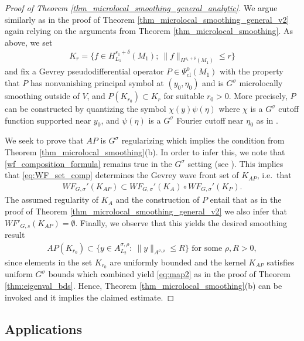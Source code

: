 \documentclass[12pt,twoside]{amsart}
\numberwithin{equation}{section}
\renewcommand{\leq}{\leqslant}
\begin{document}
 
\begin{proof}[Proof of Theorem \ref{thm_microlocal_smoothing_general_analytic}]
We argue similarly as in the proof of Theorem \ref{thm_microlocal_smoothing_general_v2} again relying on the arguments from Theorem \ref{thm_microlocal_smoothing}. As above, we set 
\begin{align*}
K_r = \{f \in H^{s_1+\delta}_{L_1}(M_1); \ \|f\|_{H^{s_1+\delta}(M_1)}\leq r\}
\end{align*}
and fix a Gevrey pseudodifferential operator $P \in \Psi^0_{\mathrm{cl}}(M_1)$ with the property that $P$ has nonvanishing principal symbol at $(y_0, \eta_0)$ and is $G^{\sigma}$ microlocally smoothing outside of $V$, and $P(K_{r_0}) \subset K_r$ for suitable $r_0 > 0$. More precisely, $P$ can be constructed by quantizing the symbol $\chi(y) \psi(\eta)$ where $\chi$ is a $G^{\sigma}$ cutoff function supported near $y_0$, and $\psi(\eta)$ is a $G^{\sigma}$ Fourier cutoff near $\eta_0$ as in \cite[Proposition 3.4.4]{Rodino_book}.

We seek to prove that $AP$ is $G^{\sigma}$ regularizing which implies the condition from  Theorem \ref{thm_microlocal_smoothing}(b).  
In order to infer this, we note that \eqref{wf_composition_formula} remains true in the $G^{\sigma}$ setting (see \cite[Section 8.5]{Hoermander}). This implies that \eqref{eq:WF_set_comp} determines the Gevrey wave front set of $K_{AP}$, i.e.\ that
\begin{align*}
WF_{G,\sigma}'(K_{AP}) \subset WF_{G,\sigma}'(K_A) \circ WF_{G,\sigma}'(K_P).
\end{align*}
The assumed regularity of $K_A$ and the construction of $P$ entail that as in the proof of Theorem \ref{thm_microlocal_smoothing_general_v2} we also infer that $WF'_{G,s}(K_{AP}) = \emptyset$. Finally, we observe that this yields the desired smoothing result 
\begin{align}
\label{eq:map2}
AP(K_{r_0}) \subset \{y\in A^{\sigma,\rho}_{L_2}: \ \|y\|_{A^{\sigma,\rho}}\leq R\} \mbox{ for some } \rho, R>0,
\end{align}
since elements in the set $K_{r_0}$ are uniformly bounded and the kernel $K_{AP}$ satisfies uniform $G^{\sigma}$ bounds which combined yield \eqref{eq:map2} as in the proof of Theorem \ref{thm:eigenval_bds}. Hence, Theorem \ref{thm_microlocal_smoothing}(b) can be invoked and it implies the claimed estimate.
\end{proof}




\subsection{Applications}
\label{sec:applicationsI}
\end{document}
